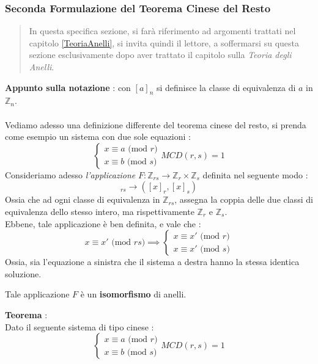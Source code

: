 \documentclass[12pt, letterpaper]{article}
\begin{document}
\subsubsection{Seconda Formulazione del Teorema Cinese del Resto}
\begin{quote}
    In questa specifica sezione, si farà riferimento ad argomenti trattati nel capitolo \ref{TeoriaAnelli}, si invita quindi 
il lettore, a soffermarsi su questa sezione esclusivamente dopo aver trattato il capitolo sulla \textit{Teoria degli Anelli}.
\end{quote}
\textbf{Appunto sulla notazione } : con \([a]_n\) si definisce la classe di equivalenza di \(a\) in \(\mathbb{Z}_n\).
\\\hphantom{}\\Vediamo adesso una definizione differente del teorema cinese del resto, si prenda come esempio un sistema 
con due sole equazioni :\begin{equation}
    \begin{cases}
        x\equiv a\text{ (mod }r)\\
        x\equiv b\text{ (mod }s)
    \end{cases}
    MCD(r,s)=1
\end{equation}
Consideriamo adesso \textit{l'applicazione} \(F:\mathbb{Z}_{rs}\rightarrow \mathbb{Z}_r \times \mathbb{Z}_s \) definita 
nel seguente modo : \begin{equation}
    [x]_{rs}\rightarrow ([x]_r,[x]_s)
\end{equation}
Ossia che ad ogni classe di equivalenza in \(\mathbb{Z}_{rs}\), assegna la coppia delle due classi di equivalenza 
dello stesso intero, ma rispettivamente  \(\mathbb{Z}_{r}\) e \(\mathbb{Z}_{s}\). \\
Ebbene, tale applicazione è ben definita, e vale che :\begin{equation}
    x\equiv x'\text{ (mod }rs) \implies \begin{cases}
        x\equiv x'\text{ (mod }r)\\x\equiv x'\text{ (mod }s)
    \end{cases}
\end{equation}
Ossia, sia l'equazione a sinistra che il sistema a destra hanno la stessa identica soluzione.
\begin{center}Tale applicazione \(F\) è un \textbf{isomorfismo} di anelli.\end{center}
\textbf{Teorema} :\\
Dato il seguente sistema di tipo cinese :\begin{equation}
    \begin{cases}
        x\equiv a\text{ (mod }r)\\
        x\equiv b\text{ (mod }s)
    \end{cases}
    MCD(r,s)=1
\end{equation}
\end{document}
